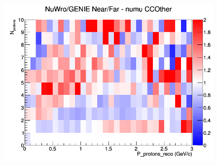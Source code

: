 \documentclass[12pt]{article}
\begin{document}
\begin{figure}[h]
\endminipage
{}
\includegraphics[width=\linewidth]{eff_N_P/GAr/protons/ratios/CCOther_NuWro_GENIE_numu_NF_N_P.png}
\endminipage
\newline
\end{figure}
\clearpage
\end{document}
